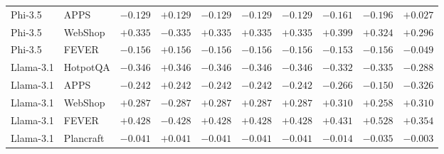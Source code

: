 \begin{table}[t]
{\begin{tabular}{l l c c c c c c c c}
Phi-3.5 & APPS     & $-0.129$ & $+0.129$ & $-0.129$ & $-0.129$ & $-0.129$ & $-0.161$ & $-0.196$ & $+0.027$ \\
Phi-3.5 & WebShop  & $+0.335$ & $-0.335$ & $+0.335$ & $+0.335$ & $+0.335$ & $+0.399$ & $+0.324$ & $+0.296$ \\
Phi-3.5 & FEVER    & $-0.156$ & $+0.156$ & $-0.156$ & $-0.156$ & $-0.156$ & $-0.153$ & $-0.156$ & $-0.049$ \\
\midrule
Llama-3.1 & HotpotQA  & $-0.346$ & $+0.346$ & $-0.346$ & $-0.346$ & $-0.346$ & $-0.332$ & $-0.335$ & $-0.288$ \\
Llama-3.1 & APPS      & $-0.242$ & $+0.242$ & $-0.242$ & $-0.242$ & $-0.242$ & $-0.266$ & $-0.150$ & $-0.326$ \\
Llama-3.1 & WebShop   & $+0.287$ & $-0.287$ & $+0.287$ & $+0.287$ & $+0.287$ & $+0.310$ & $+0.258$ & $+0.310$ \\
Llama-3.1 & FEVER     & $+0.428$ & $-0.428$ & $+0.428$ & $+0.428$ & $+0.428$ & $+0.431$ & $+0.528$ & $+0.354$ \\
Llama-3.1 & Plancraft & $-0.041$ & $+0.041$ & $-0.041$ & $-0.041$ & $-0.041$ & $-0.014$ & $-0.035$ & $-0.003$ \\
\bottomrule
\end{tabular}%
}
\end{table}